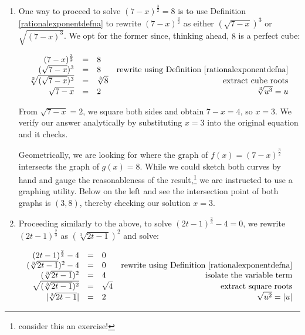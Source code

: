 \documentclass{ximera}
\begin{document}
\begin{example}
\begin{enumerate}
\item  One way to proceed to solve  $(7-x)^{\frac{3}{2}} = 8$ is to use Definition \ref{rationalexponentdefna} to rewrite $(7-x)^{\frac{3}{2}}$ as either $(\sqrt{7-x})^3$ or $\sqrt{(7-x)^3}$.  We opt for the former since, thinking ahead,  $8$ is a perfect cube: 

\[ \begin{array}{rclr}

(7-x)^{\frac{3}{2}} & = & 8 & \\

(\sqrt{7-x})^3 & = & 8 & \text{rewrite using Definition \ref{rationalexponentdefna}} \\

\sqrt[3]{(\sqrt{7-x})^3} & = & \sqrt[3]{8} & \text{extract cube roots}  \\

\sqrt{7-x} & = & 2 & \text{$\sqrt[3]{u^3}= u$} \\ \end{array} \]

From $\sqrt{7-x} =  2$, we square both sides and obtain $7-x = 4$, so $x = 3$.  We verify our answer analytically by substituting $x=3$ into the original equation and it checks.

Geometrically, we are looking for where the graph of $f(x) = (7-x)^{\frac{3}{2}}$ intersects the graph of $g(x) = 8$.  While we could sketch both curves by hand and gauge the reasonableness of the result,\footnote{consider this an exercise!} we are instructed to use a graphing utility.  Below on the left and see the intersection point of both graphs is $(3,8)$, thereby checking our solution $x = 3$.

\item  Proceeding similarly to the above, to solve $(2t-1)^{\frac{2}{3}} -4 = 0$, we rewrite $(2t-1)^{\frac{2}{3}}$ as $(\sqrt[3]{2t-1})^2$ and solve:

\[ \begin{array}{rclr}
(2t-1)^{\frac{2}{3}} -4  & = & 0 & \\

(\sqrt[3]{2t-1})^2 - 4 & = & 0 & \text{rewrite using Definition \ref{rationalexponentdefna}} \\
(\sqrt[3]{2t-1})^2 & = & 4 & \text{isolate the variable term} \\

\sqrt{(\sqrt[3]{2t-1})^2 } & = & \sqrt{4} & \text{extract square roots} \\

|\sqrt[3]{2t-1}| & = & 2 & \text{$\sqrt{u^2} = |u|$} \\


\end{array}\]
\end{enumerate}
\end{example}
\end{document}
